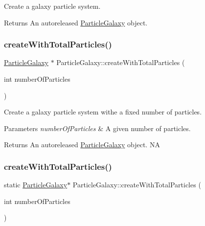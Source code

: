Create a galaxy particle system.

\begin{DoxyReturn}{Returns}
An autoreleased \hyperlink{classParticleGalaxy}{Particle\+Galaxy} object. 
\end{DoxyReturn}
\mbox{\label{classParticleGalaxy_a4fba87762831dbc74dac881592e39e14}} 
\subsubsection{\texorpdfstring{create\+With\+Total\+Particles()}{createWithTotalParticles()}\hspace{0.1cm}{\footnotesize\ttfamily [1/2]}}
{\footnotesize\ttfamily \hyperlink{classParticleGalaxy}{Particle\+Galaxy} $\ast$ Particle\+Galaxy\+::create\+With\+Total\+Particles (\begin{DoxyParamCaption}\item[{int}]{number\+Of\+Particles }\end{DoxyParamCaption})\hspace{0.3cm}{\ttfamily [static]}}

Create a galaxy particle system withe a fixed number of particles.


\begin{DoxyParams}{Parameters}
{\em number\+Of\+Particles} & A given number of particles. \\
\hline
\end{DoxyParams}
\begin{DoxyReturn}{Returns}
An autoreleased \hyperlink{classParticleGalaxy}{Particle\+Galaxy} object.  NA 
\end{DoxyReturn}
\mbox{\label{classParticleGalaxy_a9164802951fb899f007f8922a2590da5}} 
\subsubsection{\texorpdfstring{create\+With\+Total\+Particles()}{createWithTotalParticles()}\hspace{0.1cm}{\footnotesize\ttfamily [2/2]}}
{\footnotesize\ttfamily static \hyperlink{classParticleGalaxy}{Particle\+Galaxy}$\ast$ Particle\+Galaxy\+::create\+With\+Total\+Particles (\begin{DoxyParamCaption}\item[{int}]{number\+Of\+Particles }\end{DoxyParamCaption})\hspace{0.3cm}{\ttfamily [static]}}

